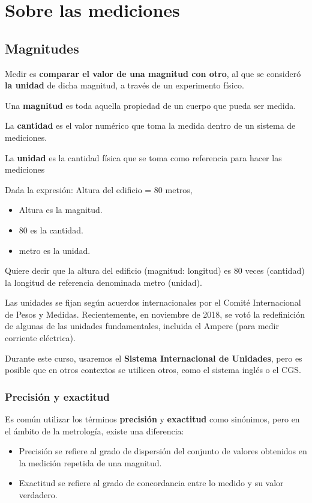 
\chapter{Sobre las mediciones}
\section{Magnitudes}
Medir es \textbf{comparar el valor de una magnitud con otro}, al que se consideró \textbf{la unidad} de dicha magnitud, a través de un experimento físico.

Una \textbf{magnitud} es toda aquella propiedad de un cuerpo que pueda ser medida.

La \textbf{cantidad} es el valor numérico que toma la medida dentro de un sistema de mediciones.

La \textbf{unidad} es la cantidad física que se toma como referencia para hacer las mediciones

\begin{ejemplo}
	Dada la expresión: Altura del edificio = 80 metros,
	\begin{itemize}
		\item Altura es la magnitud.
		\item 80 es la cantidad.
		\item metro es la unidad.
	\end{itemize}
	
	Quiere decir que la altura del edificio (magnitud: longitud) es 80 veces (cantidad) la longitud de referencia denominada metro (unidad).
\end{ejemplo}

Las unidades se fijan según acuerdos internacionales por el Comité Internacional de Pesos y Medidas. Recientemente, en noviembre de 2018, se votó la redefinición de algunas de las unidades fundamentales, incluida el Ampere (para medir corriente eléctrica).

Durante este curso, usaremos el \textbf{Sistema Internacional de Unidades}, pero es posible que en otros contextos se utilicen otros, como el sistema inglés o el CGS.
\subsection{Precisión y exactitud}
	Es común utilizar los términos \textbf{precisión} y \textbf{exactitud} como sinónimos, pero en el ámbito de la metrología, existe una diferencia:
	\begin{itemize}
		\item Precisión se refiere al grado de dispersión del conjunto de valores obtenidos en la medición repetida de una magnitud.
		\item Exactitud se refiere al grado de concordancia entre lo medido y su valor verdadero.
	\end{itemize}
